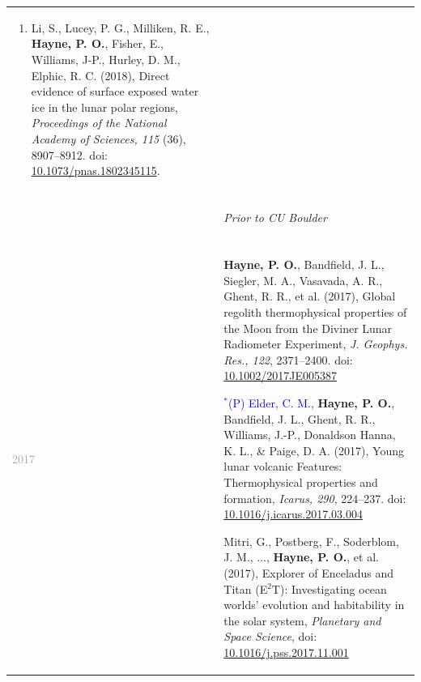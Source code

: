 \documentclass[letterpaper,10pt,twoside]{article}
\begin{document}
\begin{longtable}{@{} p{} p{}}
\begin{enumerate}[leftmargin=!,labelindent=2.5pt,itemindent=-10pt]
{             }
             \item{\small Li, S., Lucey, P. G., Milliken, R. E., \textbf{Hayne, P. O.}, Fisher, E., Williams, J-P., Hurley, D. M., Elphic, R. C. (2018), Direct evidence of surface exposed water ice in the lunar polar regions, \textit{Proceedings of the National Academy of Sciences, 115} (36), 8907--8912. doi: \href{https://doi.org/10.1073/pnas.1802345115}{10.1073/pnas.1802345115}.
             }
            \end{enumerate} \\
        
        \newpage
        & \hrulefill\\
        & \begin{center}\vspace{-0.25in}\textit{Prior to CU Boulder}\vspace{-0.25in}\end{center} \\
        & \hrulefill \\
        \vspace{0.05in}
        
        \textcolor{darkgray}{2017}    & \begin{enumerate}[leftmargin=!,labelindent=2.5pt,itemindent=-10pt]\setcounter{enumi}{77}
            {\small
            \item {\bf Hayne, P. O.}, Bandfield, J. L., Siegler, M. A., Vasavada, A. R., Ghent, R. R., et al. (2017), Global regolith thermophysical properties of the Moon from the Diviner Lunar Radiometer Experiment, \textit{J. Geophys. Res., 122}, 2371--2400. doi: \href{https://doi.org/10.1002/2017JE005387}{10.1002/2017JE005387}
    
            \item \textcolor{blue}{$^*$(P) Elder, C. M.}, {\bf Hayne, P. O.}, Bandfield, J. L., Ghent, R. R., Williams, J.-P., Donaldson Hanna, K. L., \& Paige, D. A. (2017), Young lunar volcanic Features: Thermophysical properties and formation, \textit{Icarus, 290}, 224--237. doi: \href{https://doi.org/10.1016/j.icarus.2017.03.004}{10.1016/j.icarus.2017.03.004}
    
            \item Mitri, G., Postberg, F., Soderblom, J. M., ..., \textbf{Hayne, P. O.}, et al. (2017), Explorer of Enceladus and Titan (E$^2$T): Investigating ocean worlds' evolution and habitability in the solar system, \textit{Planetary and Space Science}, doi: \href{https://doi.org/10.1016/j.pss.2017.11.001}{10.1016/j.pss.2017.11.001}
    
}
\end{enumerate}
\end{longtable}
\end{document}
